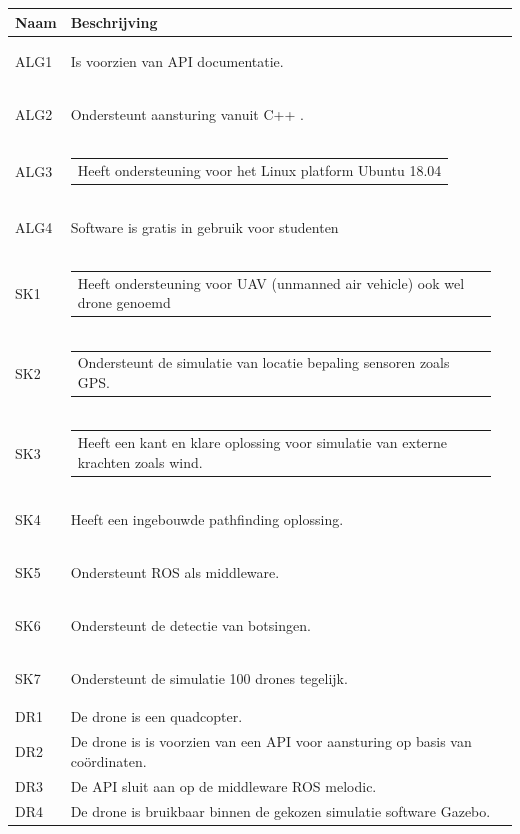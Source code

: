 \documentclass[a4paper, 11pt, oneside]{report}
\begin{document}
\begin{longtable}{|l|l|l|}
	\hline
	\rowcolor[HTML]{C0C0C0} 
	Naam & Beschrijving \\ \hline
	\endhead
		\hypertarget{alg1}{ALG1}	&Is voorzien van API documentatie.        \\ \hline
		\hypertarget{alg2}{ALG2}	&Ondersteunt aansturing vanuit C++ .    \\ \hline
		\hypertarget{alg3}{ALG3}	&\begin{tabular}[c]{@{}l@{}}Heeft ondersteuning voor het Linux platform Ubuntu 18.04\end{tabular}        \\ \hline
		\hypertarget{alg4}{ALG4}	&Software is gratis in gebruik voor studenten        \\ \hline
		\hypertarget{sk1}{SK1}		&\begin{tabular}[c]{@{}l@{}}Heeft ondersteuning voor UAV (unmanned air vehicle) ook wel drone genoemd\end{tabular} \\ \hline
		\hypertarget{sk2}{SK2}		&\begin{tabular}[c]{@{}l@{}}Ondersteunt de simulatie van locatie bepaling sensoren zoals GPS.\end{tabular}        \\ \hline
		\hypertarget{sk3}{SK3}		&\begin{tabular}[c]{@{}l@{}}Heeft een kant en klare oplossing voor simulatie van externe krachten zoals wind.\end{tabular}        \\ \hline
		\hypertarget{sk4}{SK4}		& Heeft een ingebouwde pathfinding oplossing.        \\ \hline
		\hypertarget{sk5}{SK5}		& Ondersteunt ROS als middleware.        \\ \hline
		\hypertarget{sk6}{SK6}		& Ondersteunt de detectie van botsingen.        \\ \hline
		\hypertarget{sk7}{SK7}		& Ondersteunt de simulatie 100 drones tegelijk.        \\ \hline
		DR1		& De drone is een quadcopter.        \\ \hline
		DR2		& De drone is is voorzien van een API voor aansturing op basis van coördinaten.       \\ \hline
		DR3		& De API sluit aan op de middleware ROS melodic.        \\ \hline
		DR4		& De drone is bruikbaar binnen de gekozen simulatie software Gazebo.        \\ \hline

\end{longtable}
\end{document}
